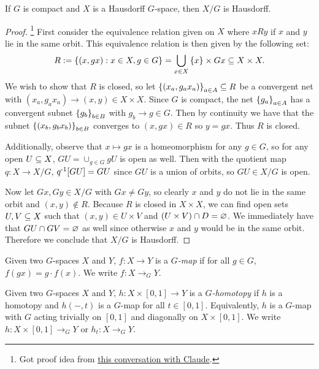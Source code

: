 \begin{proposition}
    If $G$ is compact and $X$ is a Hausdorff $G$-space, then $X/G$ is Hausdorff.
    \begin{proof}
        \footnote{
            Got proof idea from \href{https://claude.ai/share/8635611e-396a-427d-a9f2-c13dcaf48ffc}{this conversation with Claude}.
        }
        First consider the equivalence relation given on $X$ where $xRy$ if $x$ and $y$ lie in the same orbit.
        This equivalence relation is then given by the following set:
        \[
            R := \left\{ (x,gx) : x \in X, g \in G \right\} = \bigcup_{x \in X} \left\{ x \right\} \times Gx \subseteq X \times X.
        \]
        We wish to show that $R$ is closed, so let $\left\{ (x_a, g_a x_a) \right\}_{a \in A} \subseteq R$ be a convergent net with $(x_a,g_a x_a) \to (x,y) \in X \times X$.
        Since $G$ is compact, the net $\left\{ g_a \right\}_{a \in A}$ has a convergent subnet $\left\{ g_b \right\}_{b \in B}$ with $g_b \to g \in G$.
        Then by continuity we have that the subnet $\left\{ (x_b, g_b x_b) \right\}_{b \in B}$ converges to $(x,gx) \in R$ so $y = gx$.
        Thus $R$ is closed.

        Additionally, observe that $x \mapsto gx$ is a homeomorphism for any $g \in G$, so for any open $U \subseteq X$, $GU = \cup_{g \in G} gU$ is open as well.
        Then with the quotient map $q : X \to X/G$, $q^{\text{-}1}[GU] = GU$ since $GU$ is a union of orbits, so $GU \in X/G$ is open.

        Now let $Gx, Gy \in X/G$ with $Gx \neq Gy$, so clearly $x$ and $y$ do not lie in the same orbit and $(x,y) \not\in R$.
        Because $R$ is closed in $X \times X$, we can find open sets $U,V \subseteq X$ such that $(x,y) \in U \times V$ and $(U \times V) \cap D = \varnothing$.
        We immediately have that $GU \cap GV = \varnothing$ as well since otherwise $x$ and $y$ would be in the same orbit.
        Therefore we conclude that $X/G$ is Hausdorff.
    \end{proof}
\end{proposition}
    
\begin{definition}
    Given two $G$-spaces $X$ and $Y$, $f : X \to Y$ is a \emph{$G$-map} if for all $g \in G$, $f(gx) = g \cdot f(x)$.
    We write $f : X \to_G Y$.
\end{definition}

\begin{definition}
    Given two $G$-spaces $X$ and $Y$, $h : X \times [0,1] \to Y$ is a \emph{$G$-homotopy} if $h$ is a homotopy and $h(-,t)$ is a $G$-map for all $t \in [0,1]$.
    Equivalently, $h$ is a $G$-map with $G$ acting trivially on $[0,1]$ and diagonally on $X \times [0,1]$.
    We write $h : X \times [0,1] \to_G Y$ or $h_t : X \to_G Y$.
\end{definition}

